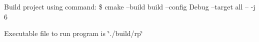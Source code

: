 Build project using command\+: \$ cmake --build build --config Debug --target all -- -\/j 6

Executable file to run program is \char`\"{}./build/rp\char`\"{} 